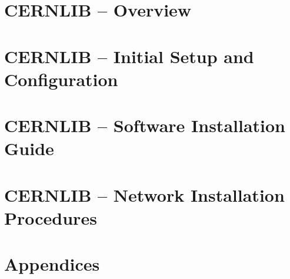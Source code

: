 \documentclass[11pt]{cernman}
\begin{document}

\setcounter{page}{1}
\part{CERNLIB -- Overview}


\part{CERNLIB -- Initial Setup and Configuration}

\part{CERNLIB -- Software Installation Guide}

\part{CERNLIB -- Network Installation Procedures}

\appendix
\part{Appendices}


\printindex
\end{document}
